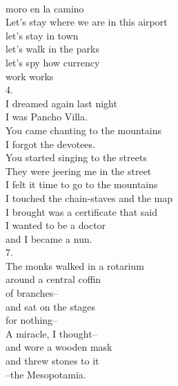 \documentclass[smalldemyvopaper,11pt,twoside,onecolumn,openright,extrafontsizes]{memoir}
\begin{document}
\\moro en la camino
\\Let's stay where we are in this airport
\\let's stay in town
\\let's walk in the parks
\\let's spy how currency
\\work works
\\4.
\\I dreamed again last night
\\I was Pancho Villa.
\\You came chanting to the mountains
\\I forgot the devotees.
\\You started singing to the streets
\\They were jeering me in the street
\\I felt it time to go to the mountains
\\I touched the chain-staves and the map
\\I brought was a certificate that said
\\I wanted to be a doctor
\\and I became a nun.
\\7.
\\The monks walked in a rotarium
\\around a central coffin
\\of branches--
\\and sat on the stages
\\for nothing--
\\A miracle, I thought--
\\and wore a wooden mask
\\and threw stones to it
\\--the Mesopotamia.
\end{document}
